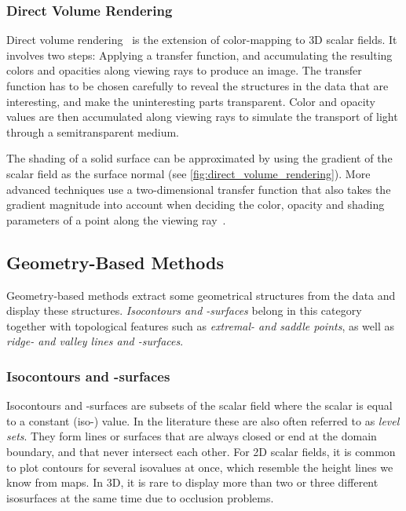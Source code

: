 %
\subsubsection{Direct Volume Rendering}
%
Direct volume rendering~\cite{Levoy1988,Drebin1988} is the extension of
color-mapping to \ac{3D} scalar fields.
%
It involves two steps: Applying a transfer function, and accumulating the
resulting colors and opacities along viewing rays to produce an image.
%
The transfer function has to be chosen carefully to reveal the structures in the
data that are interesting, and make the uninteresting parts transparent.
%
Color and opacity values are then accumulated along viewing rays to simulate the
transport of light through a semitransparent medium.
%

%
The shading of a solid surface can be approximated by using the gradient of the
scalar field as the surface normal (see \cref{fig:direct_volume_rendering}).
%
More advanced techniques use a two-dimensional transfer function that also takes
the gradient magnitude into account when deciding the color, opacity and
shading parameters of a point along the viewing ray~\cite{Kindlmann1998}.
%

\subsection{Geometry-Based Methods} %
\label{sub:scalar_geometry_based}
%
Geometry-based methods extract some geometrical structures from the data and
display these structures.
%
\emph{Isocontours and -surfaces} belong in this category together with
topological features such as \emph{extremal- and saddle points}, as well as
\emph{ridge- and valley lines and -surfaces}.
%

%
\subsubsection{Isocontours and -surfaces}
%
Isocontours and -surfaces are subsets of the scalar field where the
scalar is equal to a constant (iso-) value.
%
In the literature these are also often referred to as \emph{level sets}.
%
They form lines or surfaces that are always closed or end at the domain
boundary, and that never intersect each other.
%
For \ac{2D} scalar fields, it is common to plot contours for several isovalues
at once, which resemble the height lines we know from maps.
%
In \ac{3D}, it is rare to display more than two or three different isosurfaces
at the same time due to occlusion problems.
%


